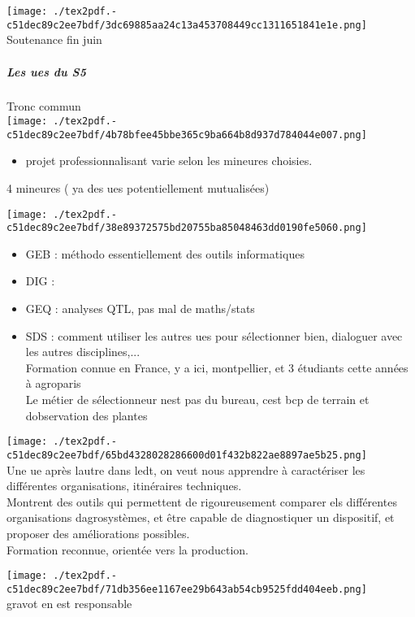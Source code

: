 \documentclass[
]{article}
\providecommand{\tightlist}{%
  \setlength{\itemsep}{0pt}\setlength{\parskip}{0pt}}
\begin{document}
\texttt{[image: ./tex2pdf.-c51dec89c2ee7bdf/3dc69885aa24c13a453708449cc1311651841e1e.png]}\\
Soutenance fin juin

\hypertarget{les-ues-du-s5}{%
\subparagraph{Les ues du S5}\label{les-ues-du-s5}}

Tronc commun\\
\texttt{[image: ./tex2pdf.-c51dec89c2ee7bdf/4b78bfee45bbe365c9ba664b8d937d784044e007.png]}

\begin{itemize}
\tightlist
\item
  projet professionnalisant varie selon les mineures choisies.
\end{itemize}

4 mineures ( ya des ues potentiellement mutualisées)

\texttt{[image: ./tex2pdf.-c51dec89c2ee7bdf/38e89372575bd20755ba85048463dd0190fe5060.png]}

\begin{itemize}
\tightlist
\item
  GEB : méthodo essentiellement des outils informatiques
\item
  DIG :
\item
  GEQ : analyses QTL, pas mal de maths/stats
\item
  SDS : comment utiliser les autres ues pour sélectionner bien,
  dialoguer avec les autres disciplines,...\\
  Formation connue en France, y a ici, montpellier, et 3 étudiants cette
  années à agroparis\\
  Le métier de sélectionneur n\textquotesingle est pas du bureau,
  c\textquotesingle est bcp de terrain et d\textquotesingle observation
  des plantes
\end{itemize}

\texttt{[image: ./tex2pdf.-c51dec89c2ee7bdf/65bd4328028286600d01f432b822ae8897ae5b25.png]}\\
Une ue après l\textquotesingle autre dans l\textquotesingle edt, on veut
nous apprendre à caractériser les différentes organisations, itinéraires
techniques.\\
Montrent des outils qui permettent de rigoureusement comparer els
différentes organisations d\textquotesingle agrosystèmes, et être
capable de diagnostiquer un dispositif, et proposer des améliorations
possibles.\\
Formation reconnue, orientée vers la production.

\texttt{[image: ./tex2pdf.-c51dec89c2ee7bdf/71db356ee1167ee29b643ab54cb9525fdd404eeb.png]}\\
gravot en est responsable
\end{document}
